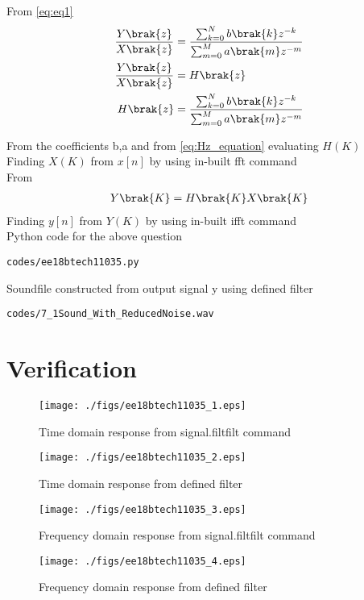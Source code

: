 \documentclass[journal,12pt,twocolumn]{IEEEtran}
\begin{document}
From \eqref{eq:eq1}
\begin{align}
\label{eq:Hz_equation}
   \frac{Y\brak{z}}{X\brak{z}} &= \frac{\sum _{k=0}^{N}b\brak{k} z^{-k}}{\sum _{m=0}^{M}a\brak{m}z^{-m}} \\
    \frac{Y\brak{z}}{X\brak{z}} &= H\brak{z} \\
    H\brak{z} &= \frac{\sum _{k=0}^{N}b\brak{k} z^{-k}}{\sum _{m=0}^{M}a\brak{m}z^{-m}}
\end{align}

From the coefficients b,a and from \eqref{eq:Hz_equation} evaluating $H(K)$
\\
Finding $X(K)$ from $x[n]$ by using in-built fft command\\

From 
\begin{align}
    Y\brak{K} = H\brak{K}X\brak{K}
\end{align}
Finding $y[n]$ from $Y(K)$ by using in-built ifft command
\\
Python code for the above question
\begin{lstlisting}
codes/ee18btech11035.py
\end{lstlisting}

Soundfile constructed from output signal y using defined filter 
\begin{lstlisting}
codes/7_1Sound_With_ReducedNoise.wav
\end{lstlisting}


\section{Verification}
\begin{figure}[!h]
\centering
\texttt{[image: ./figs/ee18btech11035\_1.eps]}
\caption{Time domain response from signal.filtfilt command}
\label{fig:Figure1}
\end{figure}

\begin{figure}[!h]
\centering
\texttt{[image: ./figs/ee18btech11035\_2.eps]}
\caption{Time domain response from defined filter}
\label{fig:Figure2}
\end{figure}

\begin{figure}[!h]
\centering
\texttt{[image: ./figs/ee18btech11035\_3.eps]}
\caption{Frequency domain response from signal.filtfilt command}
\label{fig:Figure3}
\end{figure}

\begin{figure}[!h]
\centering
\texttt{[image: ./figs/ee18btech11035\_4.eps]}
\caption{Frequency domain response from defined filter}
\label{fig:Figure4}
\end{figure}
\end{document}
